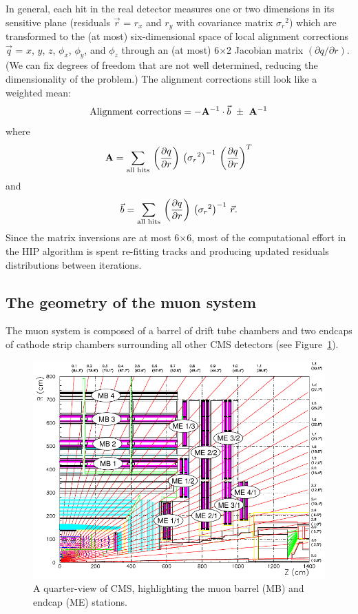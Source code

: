 \documentclass[12pt]{article}
\begin{document}
In general, each hit in the real detector measures one or two
dimensions in its sensitive plane (residuals $\vec{r}$ = $r_x$ and
$r_y$ with covariance matrix ${\sigma_r}^2$) which are transformed to the
(at most) six-dimensional space of local alignment corrections
$\vec{q}$ = $x$, $y$, $z$, $\phi_x$, $\phi_y$, and $\phi_z$ through an
(at most) 6$\times$2 Jacobian matrix $(\partial q/\partial r)$.  (We
can fix degrees of freedom that are not well determined, reducing the
dimensionality of the problem.)  The alignment corrections still look
like a weighted mean:
\begin{equation}
\mbox{Alignment corrections} = -{\bf A}^{-1} \cdot \vec{b} \ \pm\  {\bf A}^{-1}
\label{alignment_corrections1}
\end{equation}
where
\begin{equation}
{\bf A} = \sum_{\mbox{\scriptsize all hits}} \,
  \left(\frac{\partial q}{\partial r}\right) \,
  \left({\sigma_r}^2\right)^{-1} \,
  \left(\frac{\partial q}{\partial r}\right)^T
\end{equation}
and
\begin{equation}
\vec{b} = \sum_{\mbox{\scriptsize all hits}} \,
  \left(\frac{\partial q}{\partial r}\right) \,
  \left({\sigma_r}^2\right)^{-1} \,
  \vec{r} \mbox{.}
\label{alignment_corrections2}
\end{equation}
Since the matrix inversions are at most 6$\times$6, most
of the computational effort in the HIP algorithm is spent re-fitting
tracks and producing updated residuals distributions between
iterations.

\subsection{The geometry of the muon system}

The muon system is composed of a barrel of drift tube chambers and two
endcaps of cathode strip chambers surrounding all other CMS detectors
(see Figure~\ref{muon_system_labeled}).

\begin{figure}
\begin{center}
\includegraphics[width=0.75\linewidth]{intro/muon_system_labeled.pdf}
\end{center}

\caption{\label{muon_system_labeled} A quarter-view of CMS,
  highlighting the muon barrel (MB) and endcap (ME) stations.}
\end{figure}
\end{document}
